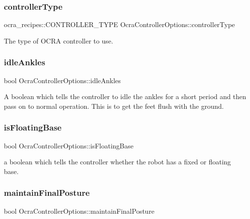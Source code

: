 \subsubsection{\texorpdfstring{controller\+Type}{controllerType}}
{\footnotesize\ttfamily ocra\+\_\+recipes\+::\+C\+O\+N\+T\+R\+O\+L\+L\+E\+R\+\_\+\+T\+Y\+PE Ocra\+Controller\+Options\+::controller\+Type}

The type of O\+C\+RA controller to use. \hypertarget{classOcraControllerOptions_a34c0a162302f4f2c462d9ce4818292d5}{}\label{classOcraControllerOptions_a34c0a162302f4f2c462d9ce4818292d5} 
\subsubsection{\texorpdfstring{idle\+Ankles}{idleAnkles}}
{\footnotesize\ttfamily bool Ocra\+Controller\+Options\+::idle\+Ankles}

A boolean which tells the controller to idle the ankles for a short period and then pass on to normal operation. This is to get the feet flush with the ground. \hypertarget{classOcraControllerOptions_a1edf322553d88c1ac2bf8947e9d942d7}{}\label{classOcraControllerOptions_a1edf322553d88c1ac2bf8947e9d942d7} 
\subsubsection{\texorpdfstring{is\+Floating\+Base}{isFloatingBase}}
{\footnotesize\ttfamily bool Ocra\+Controller\+Options\+::is\+Floating\+Base}

a boolean which tells the controller whether the robot has a fixed or floating base. \hypertarget{classOcraControllerOptions_ae7b16a5b8264abd18ee8761eb1091ccf}{}\label{classOcraControllerOptions_ae7b16a5b8264abd18ee8761eb1091ccf} 
\subsubsection{\texorpdfstring{maintain\+Final\+Posture}{maintainFinalPosture}}
{\footnotesize\ttfamily bool Ocra\+Controller\+Options\+::maintain\+Final\+Posture}

